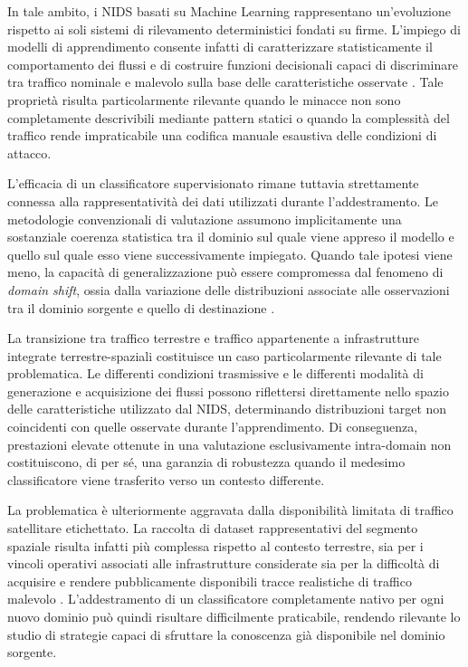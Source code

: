 In tale ambito, i NIDS basati su Machine Learning rappresentano un'evoluzione rispetto ai soli sistemi di rilevamento deterministici fondati su firme. 
L'impiego di modelli di apprendimento consente infatti di caratterizzare statisticamente il comportamento dei flussi e di costruire funzioni decisionali capaci di discriminare tra traffico nominale e malevolo sulla base delle caratteristiche osservate \cite{khraisat2019,hindy2020}. 
Tale proprietà risulta particolarmente rilevante quando le minacce non sono completamente descrivibili mediante pattern statici o quando la complessità del traffico rende impraticabile una codifica manuale esaustiva delle condizioni di attacco.

L'efficacia di un classificatore supervisionato rimane tuttavia strettamente connessa alla rappresentatività dei dati utilizzati durante l'addestramento. 
Le metodologie convenzionali di valutazione assumono implicitamente una sostanziale coerenza statistica tra il dominio sul quale viene appreso il modello e quello sul quale esso viene successivamente impiegato. 
Quando tale ipotesi viene meno, la capacità di generalizzazione può essere compromessa dal fenomeno di \textit{domain shift}, ossia dalla variazione delle distribuzioni associate alle osservazioni tra il dominio sorgente e quello di destinazione \cite{pan2010}.

La transizione tra traffico terrestre e traffico appartenente a infrastrutture integrate terrestre-spaziali costituisce un caso particolarmente rilevante di tale problematica. 
Le differenti condizioni trasmissive e le differenti modalità di generazione e acquisizione dei flussi possono riflettersi direttamente nello spazio delle caratteristiche utilizzato dal NIDS, determinando distribuzioni target non coincidenti con quelle osservate durante l'apprendimento. 
Di conseguenza, prestazioni elevate ottenute in una valutazione esclusivamente intra-domain non costituiscono, di per sé, una garanzia di robustezza quando il medesimo classificatore viene trasferito verso un contesto differente.

La problematica è ulteriormente aggravata dalla disponibilità limitata di traffico satellitare etichettato. 
La raccolta di dataset rappresentativi del segmento spaziale risulta infatti più complessa rispetto al contesto terrestre, sia per i vincoli operativi associati alle infrastrutture considerate sia per la difficoltà di acquisire e rendere pubblicamente disponibili tracce realistiche di traffico malevolo \cite{kodheli2021,azar2023}. 
L'addestramento di un classificatore completamente nativo per ogni nuovo dominio può quindi risultare difficilmente praticabile, rendendo rilevante lo studio di strategie capaci di sfruttare la conoscenza già disponibile nel dominio sorgente.

